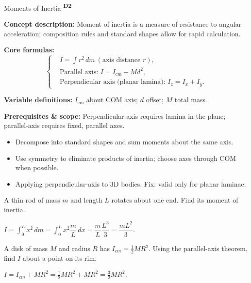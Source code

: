 ﻿\documentclass[12pt,a4paper]{article}
\providecommand{\KPFormulas}{}
\providecommand{\KPHeuristics}{}
\providecommand{\KPProblems}{}
\newcommand{\DTwo}{\texorpdfstring{\textsuperscript{\textbf{D2}}}{ D2}}
\begin{document}
\begin{KnowledgePoint}{Moments of Inertia \DTwo}
  \KPFormulas
  \begin{formulabox}
  \textbf{Concept description:} Moment of inertia is a measure of resistance to angular acceleration; composition rules and standard shapes allow for rapid calculation.
  
  \textbf{Core formulas:}
  \[
  \left\{\begin{aligned}
    &I=\int r^2\,dm\ (\text{axis distance }r),\\
    &\text{Parallel axis: } I=I_{\text{cm}}+Md^2,\\
    &\text{Perpendicular axis (planar lamina): } I_z=I_x+I_y.
  \end{aligned}\right.
  \]
  
  \textbf{Variable definitions:} $I_{\text{cm}}$ about COM axis; $d$ offset; $M$ total mass.
  
  
  \textbf{Prerequisites \& scope:} Perpendicular-axis requires lamina in the plane; parallel-axis requires fixed, parallel axes.
  \end{formulabox}
  
  \KPHeuristics
  \begin{heuristicsbox}
  \begin{itemize}[leftmargin=*]
    \item Decompose into standard shapes and sum moments about the same axis.
    \item Use symmetry to eliminate products of inertia; choose axes through COM when possible.
  \end{itemize}
  \vspace{0.4em}
  \begin{itemize}[leftmargin=*]
    \item Applying perpendicular-axis to 3D bodies. Fix: valid only for planar laminae.
  \end{itemize}
  \end{heuristicsbox}
  
  \KPProblems
\begin{cheatproblem}
  A thin rod of mass $m$ and length $L$ rotates about one end. Find its moment of inertia.
\begin{solutionbox}
  $I=\int_0^L x^2\,dm=\int_0^L x^2\dfrac{m}{L}\,dx=\dfrac{m}{L}\dfrac{L^3}{3}=\dfrac{mL^2}{3}$.
\end{solutionbox}
\end{cheatproblem}
\begin{cheatproblem}
  A disk of mass $M$ and radius $R$ has $I_{cm}=\tfrac12 MR^2$. Using the parallel-axis theorem, find $I$ about a point on its rim.
\begin{solutionbox}
  $I=I_{cm}+MR^2=\tfrac12 MR^2+MR^2=\tfrac32 MR^2$.
\end{solutionbox}
\end{cheatproblem}
\end{KnowledgePoint}
\end{document}
